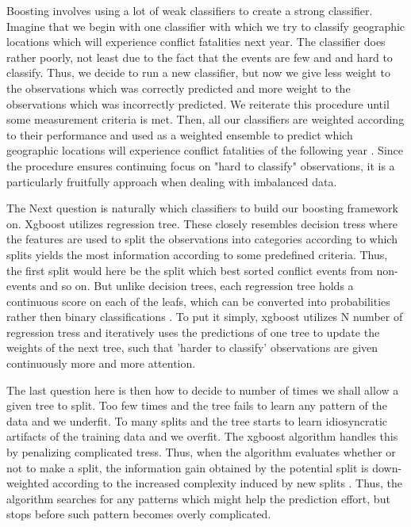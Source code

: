 \documentclass[a4paper]{article}
\begin{document}
Boosting involves using a lot of weak classifiers to create a strong classifier. Imagine that we begin with one classifier with which we try to classify geographic locations which will experience conflict fatalities next year. The classifier does rather poorly, not least due to the fact that the events are few and and hard to classify. Thus, we decide to run a new classifier, but now we give less weight to the observations which was correctly predicted and more weight to the observations which was incorrectly predicted. We reiterate this procedure until some measurement criteria is met. Then, all our classifiers are weighted according to their performance and used as a weighted ensemble to predict which geographic locations will experience conflict fatalities of the following year \citep[338-339]{Friedman_2001}. Since the procedure ensures continuing focus on "hard to classify" observations, it is a particularly fruitfully approach when dealing with imbalanced data.\par

The Next question is naturally which classifiers to build our boosting framework on. Xgboost utilizes regression tree. These closely resembles decision tress where the features are used to split the observations into categories according to which splits yields the most information according to some predefined criteria. Thus, the first split would here be the split which best sorted conflict events from non-events and so on. But unlike decision trees, each regression tree holds a continuous score on each of the leafs, which can be converted into probabilities rather then binary classifications \citep[2]{Chen_2016}. To put it simply, xgboost utilizes N number of regression tress and iteratively uses the predictions of one tree to update the weights of the next tree, such that 'harder to classify' observations are given continuously more and more attention.\par

The last question here is then how to decide to number of times we shall allow a given tree to split. Too few times and the tree fails to learn any pattern of the data and we underfit. To many splits and the tree starts to learn idiosyncratic artifacts of the training data and we overfit. The xgboost algorithm handles this by penalizing complicated tress. Thus, when the algorithm evaluates whether or not to make a split, the information gain obtained by the potential split is down-weighted according to the increased complexity induced by new splits \cite[4-7]{Chen_2016}. Thus, the algorithm searches for any patterns which might help the prediction effort, but stops before such pattern becomes overly complicated.\par 
\end{document}
